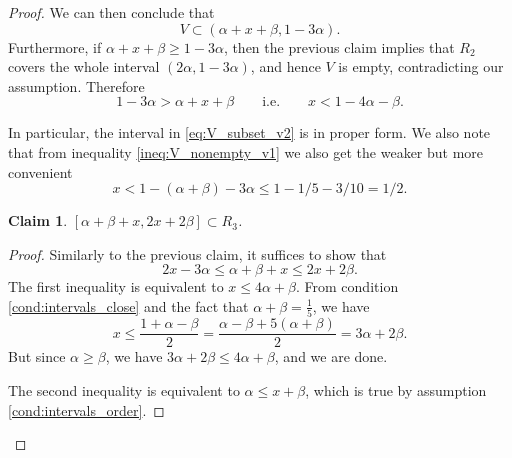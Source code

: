 \documentclass{article}
\newtheorem{claim}{Claim}
\begin{document}
\begin{proof}
        We can then conclude that 
        \begin{equation}
            V \subset (\alpha + x + \beta, 1 - 3\alpha). \label{eq:V_subset_v2}
        \end{equation}
        Furthermore, if $\alpha + x + \beta \geq 1 - 3\alpha$, then the previous claim implies that $R_2$ covers the whole interval $(2\alpha, 1 - 3\alpha)$,
        and hence $V$ is empty, contradicting our assumption.
        Therefore
        \begin{equation}
            1 - 3\alpha > \alpha + x + \beta \qquad\text{i.e.}\qquad x < 1 - 4\alpha - \beta. \label{ineq:V_nonempty_v1}
        \end{equation}

        In particular, the interval in \eqref{eq:V_subset_v2} is in proper form.
        We also note that from inequality \eqref{ineq:V_nonempty_v1} we also get the weaker but more convenient
        \begin{equation}
            x < 1 - (\alpha + \beta) - 3\alpha \leq 1 - 1/5 - 3 /10 = 1/2. \label{ineq:x_less_half}
        \end{equation} 

        \begin{claim}
            $[\alpha + \beta + x, 2x + 2\beta] \subset R_3$.
        \end{claim}
        \begin{proof}
            Similarly to the previous claim, it suffices to show that \begin{equation}
                2x - 3 \alpha \leq \alpha + \beta + x \leq 2x + 2\beta. \label{ineq:R3}
            \end{equation}
            The first inequality is equivalent to $x \leq 4\alpha + \beta$.
            From condition \eqref{cond:intervals_close} and the fact that $\alpha + \beta = \frac{1}{5}$, we have
            \begin{equation}
                x \leq \frac{1 + \alpha - \beta}{2} = \frac{\alpha - \beta + 5(\alpha + \beta)}{2}  = 3\alpha + 2\beta. \label{ineq:x_less_3alpha_2beta}
            \end{equation}
            But since $\alpha \geq \beta$, we have $3\alpha + 2\beta \leq 4\alpha + \beta$, and we are done.

            The second inequality is equivalent to $\alpha \leq x + \beta$, which is true by assumption \eqref{cond:intervals_order}.
        \end{proof}


\end{proof}
\end{document}
